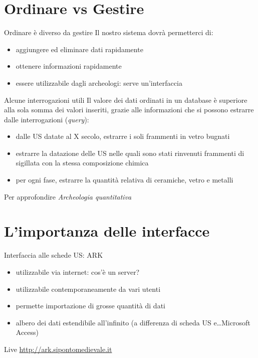 \documentclass{beamer}
\begin{document}
    \section{Ordinare vs Gestire}

        \begin{frame}{Ordinare è diverso da gestire}
            Il nostro sistema dovrà permetterci di:
            \begin{itemize}
                \item aggiungere ed eliminare dati rapidamente
                \item ottenere informazioni rapidamente
                \item essere utilizzabile dagli archeologi: serve un'interfaccia
            \end{itemize}
        \end{frame}

        \begin{frame}{Alcune interrogazioni utili}
            Il valore dei dati ordinati in un database è superiore alla sola somma dei valori inseriti,
            grazie alle informazioni che si possono estrarre dalle interrogazioni (\emph{query}):
            \begin{itemize}
                \item dalle US datate al X secolo, estrarre i soli frammenti in vetro bugnati
                \item estrarre la datazione delle US nelle quali sono stati rinvenuti frammenti di sigillata con la stessa composizione chimica
                \item per ogni fase, estrarre la quantità relativa di ceramiche, vetro e metalli
            \end{itemize}\pause
            \begin{block}{Per approfondire}
                \emph{Archeologia quantitativa}
            \end{block}
        \end{frame}

    \section{L'importanza delle interfacce}

        \begin{frame}{Interfaccia alle schede US: ARK}
            \begin{itemize}
                \item utilizzabile via internet: cos'è un server?
                \item utilizzabile contemporaneamente da vari utenti
                \item permette importazione di grosse quantità di dati
                \item albero dei dati estendibile all'infinito (a differenza di scheda US e\ldots Microsoft Access)
            \end{itemize}\pause
            \begin{block}{Live}
                \url{http://ark.sipontomedievale.it}
            \end{block}
        \end{frame}
\end{document}

